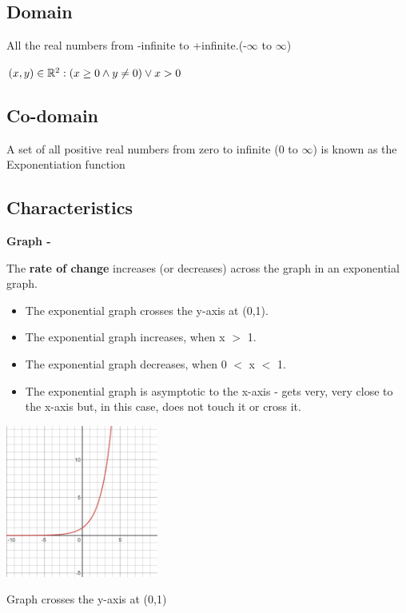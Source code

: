 \documentclass[letterpaper, 11pt]{report}
\begin{document}
\subsection*{Domain}
\cite{mathbits} All the real numbers from -infinite to +infinite.(-\(\infty\) to \(\infty\))
 \begin{center} $(x,y) \in \mathbb{R}^2 : (x \geq 0 \land y \neq 0) \lor x>0$ \end{center}
\subsection*{Co-domain}
A set of all positive real numbers from zero to infinite (0 to \(\infty\)) is known as the Exponentiation function
\subsection*{Characteristics}
\begin{flushleft}
\textbf{Graph - }
 \end{flushleft}
\begin{flushleft}
\cite{mathbits}\cite{wolframalpha} The \textbf{rate of change} increases (or decreases) across the graph in an exponential graph.
\end{flushleft}
\begin{itemize}
\item \label{graph} The exponential graph crosses the y-axis at (0,1). 
\item The exponential graph increases, when x \(>\) 1.
\item The exponential graph decreases, when 0 \(<\) x \(<\) 1.
\item The exponential graph is asymptotic to the x-axis - gets very, very close to the x-axis but, in this case, does not touch it or cross it.
\end{itemize}
\begin{center}
\includegraphics[width=5cm]{x^y}
\end{center}
\begin{center}
Graph crosses the y-axis at (0,1)\end{center}
\end{document}
